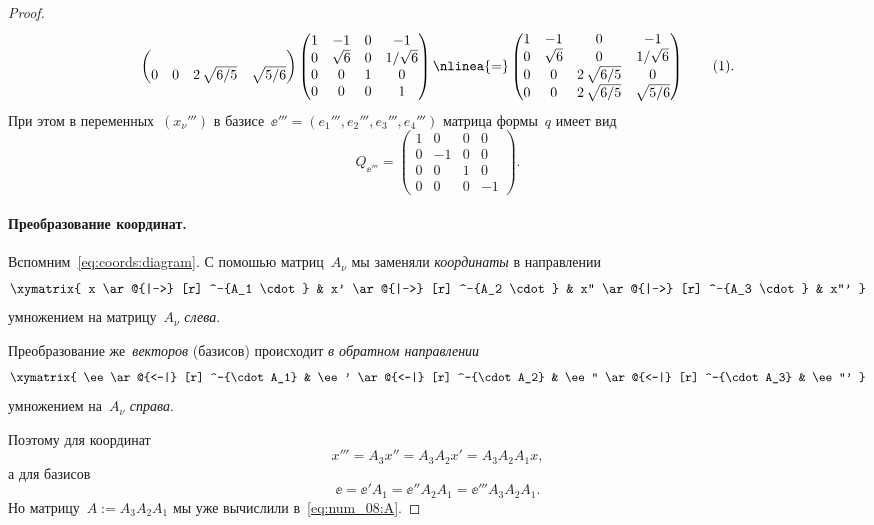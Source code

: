 \begin{proof}
\begin{align*}
\begin{pmatrix}
			\\
			0 & 0 & 2\,\sqrt{6/5} & \sqrt{5/6}
		\end{pmatrix}
		\begin{pmatrix}
			1 & -1 & 0 & -1
			\\
			0 & \sqrt{6} & 0 & 1/\sqrt{6}
			\\
			0 & 0 & 1 & 0
			\\
			0 & 0 & 0 & 1
		\end{pmatrix}
		\nlinea{=}
		\begin{pmatrix}
			1 & -1 & 0 & -1
			\\
			0 & \sqrt{6} & 0 & 1/\sqrt{6}
			\\
			0 & 0 & 2\,\sqrt{6/5} & 0
			\\
			0 & 0 & 2\,\sqrt{6/5} & \sqrt{5/6}
		\end{pmatrix}
		\refstepcounter{equation}
		\tag{\theequation}
		\label{eq:num_08:A}
		.
	\end{align*}
	При этом в переменных~$(x_\nu''')$ в базисе~$\ee''' = (e_1''', e_2''', e_3''', e_4''')$ матрица формы~$q$ имеет вид
	\begin{equation}
		\label{eq:num_08:Qs}
		Q_{\ee'''} =
		\begin{pmatrix}
			1 & 0 & 0 & 0
			\\
			0 & -1 & 0 & 0 
			\\
			0 & 0 & 1 & 0
			\\
			0 & 0 & 0 & -1
		\end{pmatrix}
		.
	\end{equation}

	\paragraph{Преобразование координат.}

	Вспомним~\eqref{eq:coords:diagram}.
	С помошью матриц~$A_\nu$ мы заменяли \emph{координаты} в направлении
	\[
		\xymatrix{
			x
			\ar @{|->} [r] ^-{A_1 \cdot}
			&
			x'
			\ar @{|->} [r] ^-{A_2 \cdot}
			&
			x''
			\ar @{|->} [r] ^-{A_3 \cdot}
			&
			x'''
		}
	\]
	умножением на матрицу~$A_\nu$ \emph{слева}.

	Преобразование же~\emph{векторов} (базисов) происходит \emph{в обратном направлении}
	\[
		\xymatrix{
			\ee
			\ar @{<-|} [r] ^-{\cdot A_1}
			&
			\ee'
			\ar @{<-|} [r] ^-{\cdot A_2}
			&
			\ee''
			\ar @{<-|} [r] ^-{\cdot A_3}
			&
			\ee'''
		}
	\]
	умножением на~$A_\nu$ \emph{справа}.

	Поэтому для координат
	\[
		x''' = A_3x'' = A_3 A_2 x' = A_3 A_2 A_1 x
		,
	\]
	а для базисов
	\[
		\ee =
		\ee' A_1 =
		\ee'' A_2 A_1 =
		\ee''' A_3 A_2 A_1
		.
	\]
	Но матрицу~$A := A_3 A_2 A_1$ мы уже вычислили в~\eqref{eq:num_08:A}.


\end{proof}

